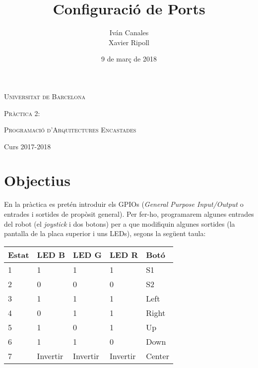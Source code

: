 \documentclass[12pt,a4paper]{article}
\title{Configuració de Ports}
\author{
    Iván Canales%
    \\
    Xavier Ripoll%
}
\date{9 de març de 2018}
\begin{document}

\begin{titlepage}
	\centering
	{\scshape\LARGE Universitat de Barcelona \par}
	\vspace{2cm}
	{\scshape\Large Pràctica 2:\par}
	\vspace{1cm}
	{\huge\bfseries \thetitle \par}

    \vfill
    \large\theauthor
	\vfill
	\raggedleft

    \par

    {\scshape Programació d'Arquitectures Encastades\par}
    \texttt{}{Curs 2017-2018\par} %
    \thedate


\end{titlepage} \pagebreak

\section{Objectius}

En la pràctica es pretén introduir els GPIOs (\textit{General Purpose
Input/Output} o entrades i sortides de propòsit general). Per fer-ho,
programarem algunes entrades del robot (el \textit{joystick} i dos botons) per
a que modifiquin algunes sortides (la pantalla de la placa superior i uns LEDs),
segons la següent taula:

\begin{table}[H]
  \centering
  \begin{tabular}{|l||l|l|l||l|} \hline
    Estat & LED B    & LED G    & LED R    & Botó   \\ \hline
    1     & 1        & 1        & 1        & S1     \\ \hline
    2     & 0        & 0        & 0        & S2     \\ \hline
    3     & 1        & 1        & 1        & Left   \\ \hline
    4     & 0        & 1        & 1        & Right  \\ \hline
    5     & 1        & 0        & 1        & Up     \\ \hline
    6     & 1        & 1        & 0        & Down   \\ \hline
    7     & Invertir & Invertir & Invertir & Center \\ \hline
  \end{tabular}
\end{table}
\end{document}

